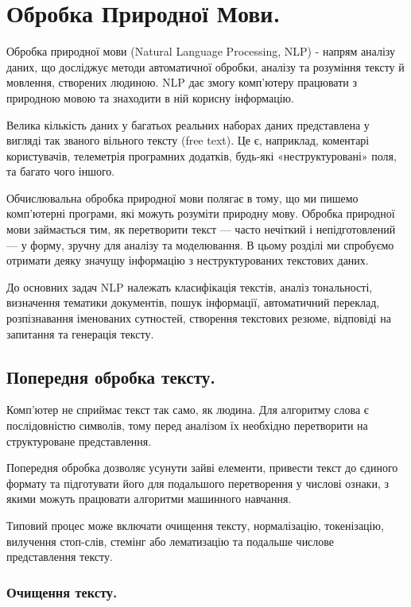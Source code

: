 \chapter{Обробка Природної Мови.}

Обробка природної мови (Natural Language Processing, NLP) - напрям аналізу даних, що досліджує методи автоматичної обробки, аналізу та розуміння тексту й мовлення, створених людиною. NLP дає змогу комп'ютеру працювати з природною мовою та знаходити в ній корисну інформацію.

Велика кількість даних у багатьох реальних наборах даних представлена у вигляді так званого вільного тексту (free text). Це є, наприклад, коментарі користувачів, телеметрія програмних додатків, будь-які «неструктуровані» поля, та багато чого іншого.

Обчислювальна обробка природної мови полягає в тому, що ми пишемо комп'ютерні програми, які можуть розуміти природну мову. Обробка природної мови займається тим, як перетворити текст — часто нечіткий і непідготовлений — у форму, зручну для аналізу та моделювання. В цьому розділі ми спробуємо отримати деяку значущу інформацію з неструктурованих текстових даних.

До основних задач NLP належать класифікація текстів, аналіз тональності, визначення тематики документів, пошук інформації, автоматичний переклад, розпізнавання іменованих сутностей, створення текстових резюме, відповіді на запитання та генерація тексту.

\section{Попередня обробка тексту.}

Комп'ютер не сприймає текст так само, як людина. Для алгоритму слова є послідовністю символів, тому перед аналізом їх необхідно перетворити на структуроване представлення.

Попередня обробка дозволяє усунути зайві елементи, привести текст до єдиного формату та підготувати його для подальшого перетворення у числові ознаки, з якими можуть працювати алгоритми машинного навчання.

Типовий процес може включати очищення тексту, нормалізацію, токенізацію, вилучення стоп-слів, стемінг або лематизацію та подальше числове представлення тексту.

\subsection{Очищення тексту.}

